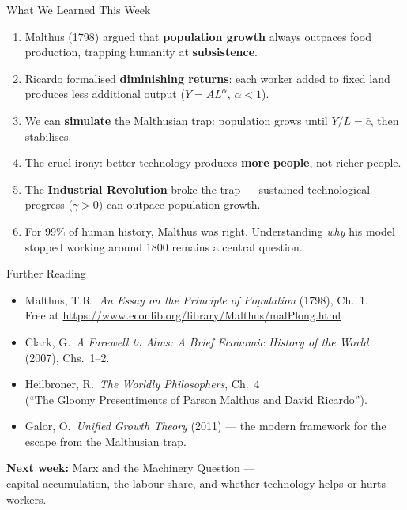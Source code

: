 \documentclass[aspectratio=169, 10pt]{beamer}
\begin{document}
\begin{frame}{What We Learned This Week}
\begin{enumerate}
  \item Malthus (1798) argued that \textbf{population growth}
        always outpaces food production, trapping humanity at
        \textbf{subsistence}.
  \item Ricardo formalised \textbf{diminishing returns}: each worker
        added to fixed land produces less additional output
        ($Y = AL^\alpha$, $\alpha < 1$).
  \item We can \textbf{simulate} the Malthusian trap: population
        grows until $Y/L = \bar{c}$, then stabilises.
  \item The \alert{cruel irony}: better technology produces
        \textbf{more people}, not richer people.
  \item The \textbf{Industrial Revolution} broke the trap ---
        sustained technological progress ($\gamma > 0$) can outpace
        population growth.
  \item For 99\% of human history, Malthus was right.
        Understanding \textit{why} his model stopped working around 1800
        remains a central question.
\end{enumerate}
\end{frame}

\begin{frame}{Further Reading}
\begin{itemize}
  \item Malthus, T.R.\ \textit{An Essay on the Principle of Population}
        (1798), Ch.~1.\\
        Free at \url{https://www.econlib.org/library/Malthus/malPlong.html}
  \item Clark, G.\ \textit{A Farewell to Alms: A Brief Economic History
        of the World} (2007), Chs.~1--2.
  \item Heilbroner, R.\ \textit{The Worldly Philosophers}, Ch.~4\\
        (``The Gloomy Presentiments of Parson Malthus and David Ricardo'').
  \item Galor, O.\ \textit{Unified Growth Theory} (2011) ---
        the modern framework for the escape from the Malthusian trap.
\end{itemize}
\vspace{1em}
\begin{center}
\textbf{Next week:} Marx and the Machinery Question ---\\
capital accumulation, the labour share, and whether technology
helps or hurts workers.
\end{center}
\end{frame}
\end{document}
